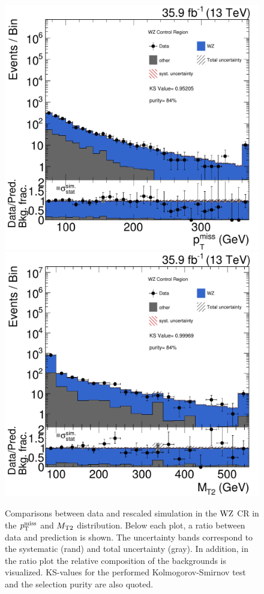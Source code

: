 \begin{figure}[tbp]
 \centering
 \includegraphics[width=\pairwidth]{figures/plots_CR_wz/CRWZ_LL_nom_met_log2}
 \includegraphics[width=\pairwidth]{figures/plots_CR_wz/CRWZ_LL_nom_mt2_log2}
 \caption{Comparisons between data and rescaled simulation in the $\mathrm{W}\mathrm{Z}$ CR in the $p_{\mathrm{T}}^\text{miss}$ and $M_{\mathrm{T2}}$ distribution. Below each plot, a ratio between data and prediction is shown. The uncertainty bands correspond to the systematic (rand) and total uncertainty (gray). In addition, in the ratio plot the relative composition of the backgrounds is visualized. KS-values for the performed Kolmogorov-Smirnov test and the selection purity are also quoted.}
 \label{fig:CRWZ}
\end{figure}
